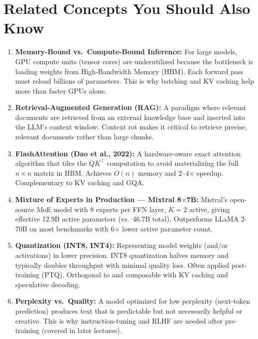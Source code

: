 \documentclass[11pt, a4paper]{article}
\begin{document}
\newpage
\section{Related Concepts You Should Also Know}

\begin{enumerate}[leftmargin=2em]
  \item \textbf{Memory-Bound vs.\ Compute-Bound Inference:} For large models, GPU compute units (tensor cores) are underutilized because the bottleneck is loading weights from High-Bandwidth Memory (HBM). Each forward pass must reload billions of parameters. This is why batching and KV caching help more than faster GPUs alone.

  \item \textbf{Retrieval-Augmented Generation (RAG):} A paradigm where relevant documents are retrieved from an external knowledge base and inserted into the LLM's context window. Context rot makes it critical to retrieve precise, relevant documents rather than large chunks.

  \item \textbf{FlashAttention (Dao et al., 2022):} A hardware-aware exact attention algorithm that tiles the $QK^\top$ computation to avoid materializing the full $n \times n$ matrix in HBM. Achieves $O(n)$ memory and 2--4$\times$ speedup. Complementary to KV caching and GQA.

  \item \textbf{Mixture of Experts in Production --- Mixtral 8$\times$7B:} Mistral's open-source MoE model with 8 experts per FFN layer, $K=2$ active, giving effective 12.9B active parameters (vs.\ 46.7B total). Outperforms LLaMA 2-70B on most benchmarks with 6$\times$ lower active parameter count.

  \item \textbf{Quantization (INT8, INT4):} Representing model weights (and/or activations) in lower precision. INT8 quantization halves memory and typically doubles throughput with minimal quality loss. Often applied post-training (PTQ). Orthogonal to and composable with KV caching and speculative decoding.

  \item \textbf{Perplexity vs.\ Quality:} A model optimized for low perplexity (next-token prediction) produces text that is predictable but not necessarily helpful or creative. This is why instruction-tuning and RLHF are needed after pre-training (covered in later lectures).


\end{enumerate}
\end{document}
